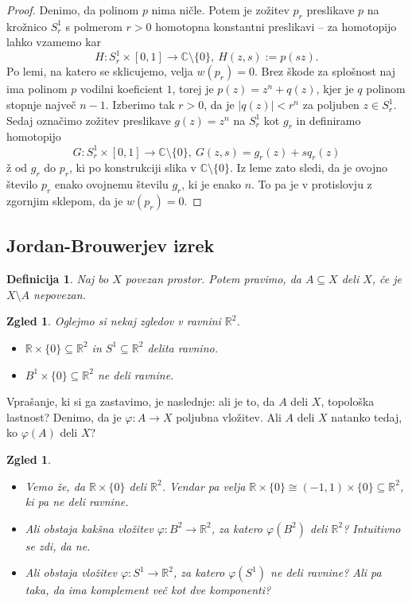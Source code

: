 \documentclass[10pt, a4paper]{article}
\newtheorem{defi}[izr]{Definicija}
\newenvironment{noticeB}{%
  \tcolorbox[%
  notitle,
  empty,
  enhanced,  %
  breakable,
  coltext=black,
  colback=white, 
  fontupper=\rmfamily,
  noparskip,
  sharp corners,
  boxrule=-1pt,  %
  frame hidden,
  left=7pt,  %
  right=7pt,
  top=5pt,
  bottom=5pt,
  before skip=2.5ex plus 2pt,
  after skip=2.5ex plus 2pt,
  borderline west = {1.5pt}{-0.1pt}{blue!30!black}, %
  overlay unbroken and last={%
    \draw[color=black, line width=1.25pt]
    ($(frame.south west)+(1.pt, -0.1pt)$) -- ++(2em, 0);
  }
  ]}
{\endtcolorbox}
\newenvironment{definicija}{\begin{noticeB}\begin{defi}}{%
\end{defi}\end{noticeB}}
\newtheorem{zgled}[izr]{Zgled}
\newenvironment{noticeC}{%
  \tcolorbox[%
  notitle,
  empty,
  enhanced,  %
  breakable,
  coltext=black, 
  fontupper=\rmfamily,
  noparskip,
  sharp corners,
  boxrule=-1pt,  %
  frame hidden,
  left=7pt,  %
  right=7pt,
  top=5pt,
  bottom=5pt,
  before skip=2.5ex plus 2pt,
  after skip=2.5ex plus 2pt,
  overlay unbroken and last={%
  },
  ]}
{\endtcolorbox}
\newenvironment{dokaz}%
  {\begin{noticeC}\begin{proof}}%
  {\end{proof}\end{noticeC}}
\newcommand{\R}{\mathbb {R}}
\newcommand{\C}{\mathbb {C}}
\begin{document}
\begin{dokaz}
  Denimo, da polinom $p$ nima ničle. Potem je zožitev $p_r$ preslikave $p$ 
  na krožnico $S_r^1$ s polmerom $r > 0$ homotopna konstantni preslikavi -- za homotopijo 
  lahko vzamemo kar $$H: S_r ^1 \times [0, 1] \to \C \setminus \{0\},\ H(z, s) := p(sz).$$
  Po lemi, na katero se sklicujemo, velja $w(p_r) = 0.$
  Brez škode za splošnost naj ima polinom $p$ vodilni koeficient $1$, torej je 
  $p(z) = z^n + q(z)$, kjer je $q$ polinom stopnje največ $n - 1$.
  Izberimo tak $r > 0$, da je $|q(z)| < r^n$ za poljuben $z \in S^1 _r$.
  Sedaj označimo zožitev preslikave $g(z) = z^n$ na $S^1 _r$ kot $g_r$ in definiramo homotopijo 
  $$G: S_r ^1 \times [0, 1] \to \C \setminus \{0\},\ G(z, s) = g_r (z) + s q_r(z)$$ ž
  od $g_r$ do $p_r$, ki po konstrukciji slika v $\C \setminus \{0\}$.
  Iz leme zato sledi, da je ovojno število $p_r$ enako ovojnemu številu $g_r$, ki je enako $n$.
  To pa je v protislovju z zgornjim sklepom, da je $w(p_r) = 0.$
\end{dokaz}

\subsection{Jordan-Brouwerjev izrek}

\begin{definicija}
  Naj bo $X$ povezan prostor. Potem pravimo, da $A \subseteq X$ deli $X$,
  če je $X \setminus A$ nepovezan.
\end{definicija}

\begin{zgled}
  Oglejmo si nekaj zgledov v ravnini $\R^2$.
  \begin{itemize}
    \item $\R \times \{0\} \subseteq \R^2$ in $S^1 \subseteq \R^2$ delita ravnino.
    \item $B^1 \times \{0\} \subseteq \R^2$ ne deli ravnine.
  \end{itemize}
\end{zgled}

Vprašanje, ki si ga zastavimo, je naslednje: ali je to, da $A$ deli $X$, topološka lastnost?
Denimo, da je $\varphi: A \to X$ poljubna vložitev. Ali $A$ deli $X$ natanko tedaj, ko 
$\varphi(A)$ deli $X$?

\begin{zgled}
  \begin{itemize}
    \item Vemo že, da $\R \times \{0\}$ deli $\R^2$. 
    Vendar pa velja $\R \times \{0\} \cong (-1, 1) \times \{0\} \subseteq \R^2$,
    ki pa ne deli ravnine.
    \item Ali obstaja kakšna vložitev $\varphi: B^2 \to \R^2$, za katero 
    $\varphi (B^2)$ deli $\R^2$? Intuitivno se zdi, da ne.
    \item Ali obstaja vložitev $\varphi: S^1 \to \R^2$, za katero $\varphi (S^1)$
    ne deli ravnine? Ali pa taka, da ima komplement več kot dve komponenti?
  \end{itemize}
\end{zgled}
\end{document}
